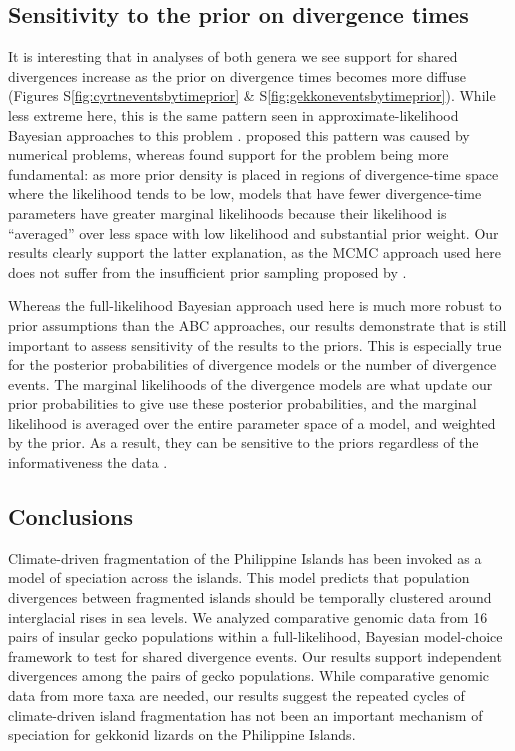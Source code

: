 \subsection{Sensitivity to the prior on divergence times}

It is interesting that in analyses of both genera we see support for shared
divergences increase as the prior on divergence times becomes more diffuse
(Figures
S\ref{fig:cyrtneventsbytimeprior}
\&
S\ref{fig:gekkoneventsbytimeprior}).
While less extreme here, this is the same pattern seen in
approximate-likelihood Bayesian approaches to this problem
\citep{Oaks2012,Hickerson2013,Oaks2014reply}.
\citet{Hickerson2013} proposed this pattern was caused by numerical problems,
whereas \citet{Oaks2014reply} found support for the problem being more
fundamental:
as more prior density is placed in regions of divergence-time space where the
likelihood tends to be low, models that have fewer divergence-time parameters
have greater marginal likelihoods because their likelihood is ``averaged''
over less space with low likelihood and substantial prior weight.
Our results clearly support the latter explanation, as the MCMC approach used
here does not suffer from the insufficient prior sampling proposed by
\citet{Hickerson2013}.

Whereas the full-likelihood Bayesian approach used here is much more robust to
prior assumptions than the ABC approaches, our results demonstrate that is
still important to assess sensitivity of the results to the priors.
This is especially true for the posterior probabilities of divergence models or
the number of divergence events.
The marginal likelihoods of the divergence models are what update our prior
probabilities to give use these posterior probabilities, and the marginal
likelihood is averaged over the entire parameter space of a model, and weighted
by the prior.
As a result, they can be sensitive to the priors regardless of the
informativeness the data \citep{Oaks2018marginal}.

\subsection{Conclusions}
Climate-driven fragmentation of the Philippine Islands has been invoked as
a model of speciation across the islands.
This model predicts that population divergences between fragmented islands
should be temporally clustered around interglacial rises in sea levels.
We analyzed comparative genomic data from 16 pairs of insular gecko populations
within a full-likelihood, Bayesian model-choice framework to test for shared
divergence events.
Our results support independent divergences among the pairs of gecko
populations.
While comparative genomic data from more taxa are needed, our results suggest
the repeated cycles of climate-driven island fragmentation has not been an
important mechanism of speciation for gekkonid lizards on the Philippine
Islands.
